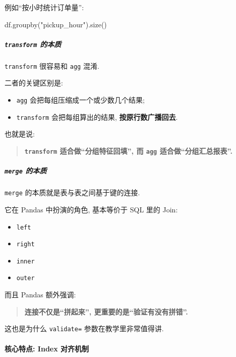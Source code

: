 \documentclass[11pt]{article}
\providecommand{\tightlist}{%
      \setlength{\itemsep}{0pt}\setlength{\parskip}{0pt}}
\newenvironment{Shaded}{}{}
\newcommand{\StringTok}[1]{\textcolor[rgb]{0.25,0.44,0.63}{{#1}}}
\newcommand{\NormalTok}[1]{{#1}}
\begin{document}
例如``按小时统计订单量'':

\begin{Shaded}
\begin{Highlighting}[]
\NormalTok{df.groupby(}\StringTok{"pickup\_hour"}\NormalTok{).size()}
\end{Highlighting}
\end{Shaded}

    \subparagraph{\texorpdfstring{\texttt{transform}
的本质}{transform 的本质}}\label{transform-ux7684ux672cux8d28}

    \texttt{transform} 很容易和 \texttt{agg} 混淆.

二者的关键区别是:

\begin{itemize}
\tightlist
\item
  \texttt{agg} 会把每组压缩成一个或少数几个结果;
\item
  \texttt{transform} 会把每组算出的结果, \textbf{按原行数广播回去}.
\end{itemize}

也就是说:

\begin{quote}
\textbf{\texttt{transform} 适合做``分组特征回填'', 而 \texttt{agg}
适合做``分组汇总报表''.}
\end{quote}

    \subparagraph{\texorpdfstring{\texttt{merge}
的本质}{merge 的本质}}\label{merge-ux7684ux672cux8d28}

    \texttt{merge} 的本质就是表与表之间基于键的连接.

它在 Pandas 中扮演的角色, 基本等价于 SQL 里的 Join:

\begin{itemize}
\tightlist
\item
  \texttt{left}
\item
  \texttt{right}
\item
  \texttt{inner}
\item
  \texttt{outer}
\end{itemize}

而且 Pandas 额外强调:

\begin{quote}
\textbf{连接不仅是``拼起来'', 更重要的是``验证有没有拼错''.}
\end{quote}

这也是为什么 \texttt{validate=} 参数在教学里非常值得讲.

    \paragraph{核心特点: Index
对齐机制}\label{ux6838ux5fc3ux7279ux70b9-index-ux5bf9ux9f50ux673aux5236}
\end{document}

